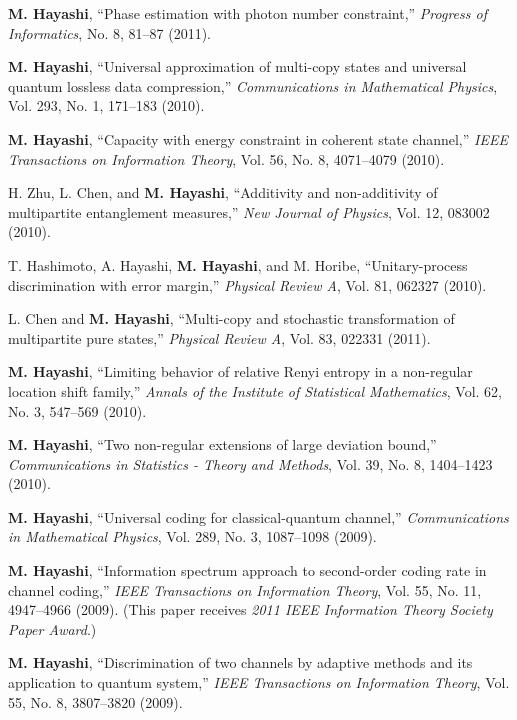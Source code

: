 \documentclass[a4paper,12pt,oneside]{article}
\begin{document}
\begin{enumerate}
	\textbf{M. Hayashi}, 
``Phase estimation with photon number constraint,'' 
{\em Progress of Informatics}, No. 8, 81--87 (2011).

	\textbf{M. Hayashi}, 
``Universal approximation of multi-copy states and universal quantum lossless data compression,'' 
{\em Communications in Mathematical Physics}, Vol. 293, No. 1, 171--183 (2010). 

	\textbf{M. Hayashi}, 
``Capacity with energy constraint in coherent state channel,'' 
{\em IEEE Transactions on Information Theory}, Vol. 56, No. 8, 4071--4079 (2010).

	H. Zhu, L. Chen, and \textbf{M. Hayashi}, 
``Additivity and non-additivity of multipartite entanglement measures,'' 
{\em New Journal of Physics}, Vol. 12, 083002 (2010). 

	T. Hashimoto, A. Hayashi, \textbf{M. Hayashi}, and M. Horibe, 
``Unitary-process discrimination with error margin,'' 
{\em Physical Review A}, Vol. 81, 062327 (2010).

	L. Chen and \textbf{M. Hayashi}, 
``Multi-copy and stochastic transformation of multipartite pure states,'' 
{\em Physical Review A}, Vol. 83, 022331 (2011).

	\textbf{M. Hayashi}, 
``Limiting behavior of relative Renyi entropy in a non-regular location shift family,'' 
{\em Annals of the Institute of Statistical Mathematics}, Vol. 62, No. 3, 547--569 (2010).

	\textbf{M. Hayashi}, 
``Two non-regular extensions of large deviation bound,'' 
{\em Communications in Statistics - Theory and Methods}, 
Vol. 39, No. 8, 1404--1423 (2010). 

	\textbf{M. Hayashi}, 
``Universal coding for classical-quantum channel,'' 
{\em Communications in Mathematical Physics}, Vol. 289, No. 3, 1087--1098 (2009). 

	\textbf{M. Hayashi}, 
``Information spectrum approach to second-order coding rate in channel coding,'' 
{\em IEEE Transactions on Information Theory},
Vol. 55, No. 11, 4947--4966 (2009). 
(This paper receives {\em 2011 IEEE Information Theory Society Paper Award}.)

	\textbf{M. Hayashi}, 
``Discrimination of two channels by adaptive methods and its application to quantum system,'' 
{\em IEEE Transactions on Information Theory}, 
Vol. 55, No. 8, 3807--3820 (2009).


\end{enumerate}
\end{document}
